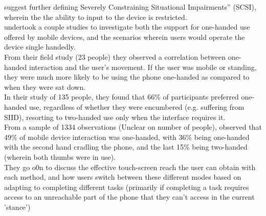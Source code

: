 \cite{sarsenbayeva2017challenges} suggest further defining Severely Constraining Situational Impairments” (SCSI), wherein the the ability to input to the device is restricted.\\

\cite{karlson2006understanding} undertook a couple studies to investigate both the support for one-handed use offered by mobile devices, and the scenarios wherein users would operate the device single handedly.\\
From their field study (23 people) they observed a correlation between one-handed interaction and the user's movement. If the user was mobile or standing, they were much more likely to be using the phone one-handed as compared to when they were sat down.\\
In their study of 135 people, they found that 66\% of participants preferred one-handed use, regardless of whether they were encumbered (e.g. suffering from SIID), resorting to two-handed use only when the interface requires it.\\

From a sample of 1334 observations (Unclear on number of people), \cite{hoober2013users} observed that 49\% of mobile device interaction was one-handed, with 36\% being one-handed with the second hand cradling the phone, and the last 15\% being two-handed (wherein both thumbs were in use).\\
They go o0n to discuss the effective touch-screen reach the user can obtain with each method, and how users switch between these different modes based on adapting to completing different tasks (primarily if completing a task requires access to an unreachable part of the phone that they can't access in the current 'stance')\\

